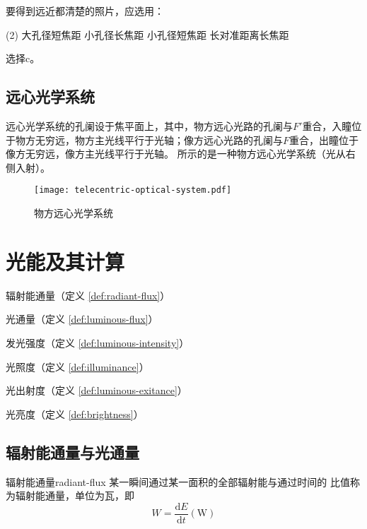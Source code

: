 \documentclass[cn,10pt,chinesefont=founder,math=newtx,cite=super,twoside]{elegantbook}
\begin{document}
\begin{problem}
	要得到远近都清楚的照片，应选用： 
	\begin{tasks}(2)
		\task 大孔径短焦距
		\task 小孔径长焦距
		\task 小孔径短焦距
		\task 长对准距离长焦距
	\end{tasks}
\end{problem}
\begin{solution}
	选择c。
\end{solution}

\section{远心光学系统}
远心光学系统的孔阑设于焦平面上，其中，物方远心光路的孔阑与$F'$重合，入瞳位于物方无穷远，物方主光线平行于光轴；像方远心光路的孔阑与$F$重合，出瞳位于像方无穷远，像方主光线平行于光轴。 所示的是一种物方远心光学系统（光从右侧入射）。

\begin{figure}[htbp]
	\centering
	\texttt{[image: telecentric-optical-system.pdf]}
	\caption{物方远心光学系统}
	\label{fig:telecentric-optical-system}
\end{figure}

\chapter{光能及其计算}

\begin{introduction}
	\item 辐射能通量（定义 \ref{def:radiant-flux}）
	\item 光通量（定义 \ref{def:luminous-flux}）
	\item 发光强度（定义 \ref{def:luminous-intensity}）
	\item 光照度（定义 \ref{def:illuminance}）
	\item 光出射度（定义 \ref{def:luminous-exitance}）
	\item 光亮度（定义 \ref{def:brightness}）
\end{introduction}

\section{辐射能通量与光通量}

\begin{definition}{辐射能通量}{radiant-flux}
	某一瞬间通过某一面积的全部辐射能与通过时间的 比值称为辐射能通量，单位为瓦，即
	\begin{equation}
	W=\frac{\mathrm{d}E}{\mathrm{d}t}(\mathrm{W})
	\end{equation}
\end{definition}
\end{document}
